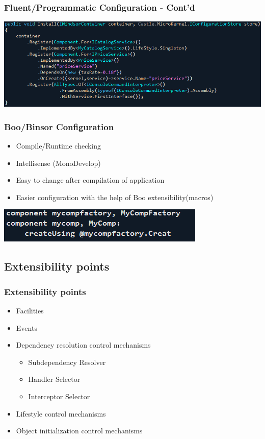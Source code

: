 \documentclass[turkish]{beamer}
\begin{document}
		\frame
		{
			\frametitle{Fluent/Programmatic Configuration - Cont'd}
			\begin{center}
				\includegraphics[scale=0.40]{images/fluentconfiguration.png}
			\end{center}
		}
		\frame
		{
			\frametitle{Boo/Binsor Configuration}
			\begin{itemize}
				\item<1->Compile/Runtime checking 
				\item<2->Intellisense (MonoDevelop)
				\item<3->Easy to change after compilation of application
				\item<4->Easier configuration with the help of Boo extensibility(macros)
			\end{itemize}
			\begin{center}
				\includegraphics[scale=0.40]{images/binsorconfiguration.png}
			\end{center}
		}
	\subsection{Extensibility points}
		 \frame
			{
				\frametitle{Extensibility points}
			  \begin{itemize}
			  	\item<1->Facilities
			  	\item<2->Events
			  	\item<3->Dependency resolution control mechanisms
			  	\begin{itemize}
			  	  \item<4->Subdependency Resolver
			  		\item<5->Handler Selector
			  		\item<6->Interceptor Selector
			  	\end{itemize}
			  	\item<7->Lifestyle control mechanisms
			  	\item<8->Object initialization control mechanisms
			  \end{itemize}
			}
\end{document}
